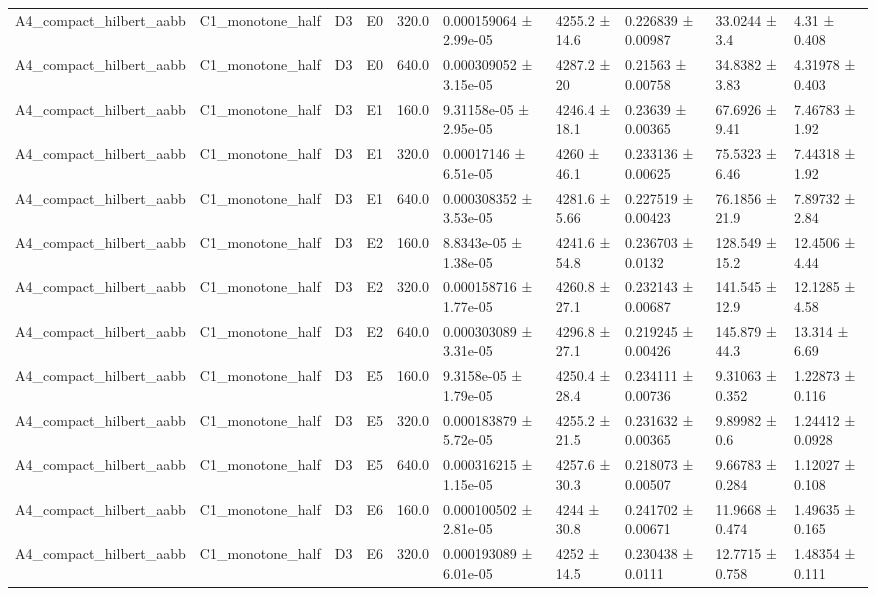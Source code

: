 \begin{table}
\begin{tabular}{llllllllll}
A4\_compact\_hilbert\_aabb & C1\_monotone\_half & D3 & E0 & 320.0 & 0.000159064 ± 2.99e-05 & 4255.2 ± 14.6 & 0.226839 ± 0.00987 & 33.0244 ± 3.4 & 4.31 ± 0.408 \\
A4\_compact\_hilbert\_aabb & C1\_monotone\_half & D3 & E0 & 640.0 & 0.000309052 ± 3.15e-05 & 4287.2 ± 20 & 0.21563 ± 0.00758 & 34.8382 ± 3.83 & 4.31978 ± 0.403 \\
A4\_compact\_hilbert\_aabb & C1\_monotone\_half & D3 & E1 & 160.0 & 9.31158e-05 ± 2.95e-05 & 4246.4 ± 18.1 & 0.23639 ± 0.00365 & 67.6926 ± 9.41 & 7.46783 ± 1.92 \\
A4\_compact\_hilbert\_aabb & C1\_monotone\_half & D3 & E1 & 320.0 & 0.00017146 ± 6.51e-05 & 4260 ± 46.1 & 0.233136 ± 0.00625 & 75.5323 ± 6.46 & 7.44318 ± 1.92 \\
A4\_compact\_hilbert\_aabb & C1\_monotone\_half & D3 & E1 & 640.0 & 0.000308352 ± 3.53e-05 & 4281.6 ± 5.66 & 0.227519 ± 0.00423 & 76.1856 ± 21.9 & 7.89732 ± 2.84 \\
A4\_compact\_hilbert\_aabb & C1\_monotone\_half & D3 & E2 & 160.0 & 8.8343e-05 ± 1.38e-05 & 4241.6 ± 54.8 & 0.236703 ± 0.0132 & 128.549 ± 15.2 & 12.4506 ± 4.44 \\
A4\_compact\_hilbert\_aabb & C1\_monotone\_half & D3 & E2 & 320.0 & 0.000158716 ± 1.77e-05 & 4260.8 ± 27.1 & 0.232143 ± 0.00687 & 141.545 ± 12.9 & 12.1285 ± 4.58 \\
A4\_compact\_hilbert\_aabb & C1\_monotone\_half & D3 & E2 & 640.0 & 0.000303089 ± 3.31e-05 & 4296.8 ± 27.1 & 0.219245 ± 0.00426 & 145.879 ± 44.3 & 13.314 ± 6.69 \\
A4\_compact\_hilbert\_aabb & C1\_monotone\_half & D3 & E5 & 160.0 & 9.3158e-05 ± 1.79e-05 & 4250.4 ± 28.4 & 0.234111 ± 0.00736 & 9.31063 ± 0.352 & 1.22873 ± 0.116 \\
A4\_compact\_hilbert\_aabb & C1\_monotone\_half & D3 & E5 & 320.0 & 0.000183879 ± 5.72e-05 & 4255.2 ± 21.5 & 0.231632 ± 0.00365 & 9.89982 ± 0.6 & 1.24412 ± 0.0928 \\
A4\_compact\_hilbert\_aabb & C1\_monotone\_half & D3 & E5 & 640.0 & 0.000316215 ± 1.15e-05 & 4257.6 ± 30.3 & 0.218073 ± 0.00507 & 9.66783 ± 0.284 & 1.12027 ± 0.108 \\
A4\_compact\_hilbert\_aabb & C1\_monotone\_half & D3 & E6 & 160.0 & 0.000100502 ± 2.81e-05 & 4244 ± 30.8 & 0.241702 ± 0.00671 & 11.9668 ± 0.474 & 1.49635 ± 0.165 \\
A4\_compact\_hilbert\_aabb & C1\_monotone\_half & D3 & E6 & 320.0 & 0.000193089 ± 6.01e-05 & 4252 ± 14.5 & 0.230438 ± 0.0111 & 12.7715 ± 0.758 & 1.48354 ± 0.111 \\

\end{tabular}
\end{table}
